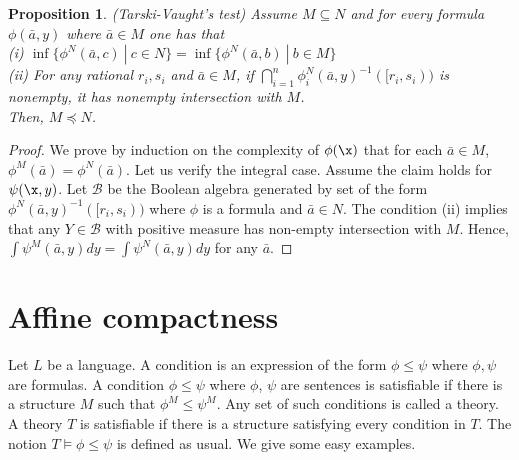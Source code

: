 \documentclass[12pt]{article}
\newtheorem{proposition}[theorem]{Proposition}
\def\a{\bar {a}}\def\b{\bar {b}}\def\c{\bar {c}}
\begin{document}
\begin{proposition}\label{tarski} \emph{(Tarski-Vaught's test)}
Assume $M\subseteq N$ and for every formula $\phi(\a,y)$ where $\a\in M$ one has that\\
(i) $\inf\{\phi^N(\bar{a},c)\ | \ c\in N\}=\inf\{\phi^N(\bar{a},b) \ | \ b\in M\}$\\
(ii) For any rational $r_i,s_i$ and $\a\in M$, if $\bigcap_{i=1}^n\phi_i^N(\a,y)^{-1}([r_i,s_i))$
is nonempty, it has nonempty intersection with $M$.\\ Then, $M\preccurlyeq N$.
\end{proposition}
\begin{proof}
We prove by induction on the complexity of $\phi(\x)$ that for each $\a\in M$, $\phi^M(\a)=\phi^N(\a)$.
Let us verify the integral case. Assume the claim holds for $\psi(\x,y)$.
Let $\mathcal B$ be the Boolean algebra generated by set of the form $\phi^N(\a,y)^{-1}([r_i,s_i))$
where $\phi$ is a formula and $\a\in N$. The condition (ii) implies that any $Y\in\mathcal B$
with positive measure has non-empty intersection with $M$. Hence, $\int\psi^M(\a,y)dy=\int\psi^N(\a,y)dy$ for any $\a$.
\end{proof}

\section{Affine compactness}\label{section compactness}
Let $L$ be a language. A condition is an expression of the form $\phi\leqslant\psi$ where $\phi,\psi$ are formulas.
A condition $\phi\leqslant\psi$ where $\phi$, $\psi$ are sentences is satisfiable if there is a structure $M$
such that $\phi^M\leqslant\psi^M$. Any set of such conditions is called a theory. A theory $T$ is satisfiable if
there is a structure satisfying every condition in $T$. The notion $T\vDash\phi\leqslant\psi$ is defined as usual.
We give some easy examples.
\end{document}
